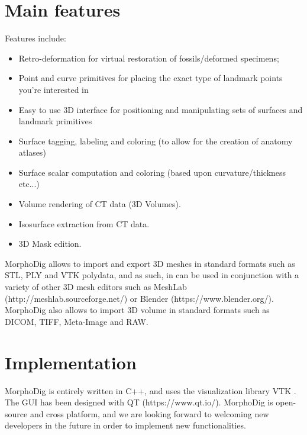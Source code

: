 \documentclass[12pt, a4paper]{book}
\begin{document}
\section*{Main features}
Features include:
\begin{itemize}
\item Retro-deformation for virtual restoration of fossils/deformed specimens;
\item Point and curve primitives for placing the exact type of landmark points you’re interested in
\item Easy to use 3D interface for positioning and manipulating sets of surfaces and landmark primitives
\item Surface tagging, labeling and coloring (to allow for the creation of anatomy atlases)
\item Surface scalar computation and coloring (based upon curvature/thickness etc...)
\item Volume rendering of CT data (3D Volumes).
\item Isosurface extraction from  CT data.
\item 3D Mask edition.
\end{itemize}

MorphoDig allows to import and export 3D meshes in standard formats such as STL, PLY and VTK polydata, and as such, in can be used in conjunction with a variety of other 3D mesh editors such  as MeshLab (http://meshlab.sourceforge.net/) or Blender (https://www.blender.org/). MorphoDig also allows to import 3D volume in standard formats such as DICOM, TIFF, Meta-Image and RAW.
\section*{Implementation}
MorphoDig is entirely written in C++, and uses the visualization library VTK \citep{Avila2001}. The GUI has been designed with QT (https://www.qt.io/). MorphoDig is open-source and cross platform, and we are looking forward to welcoming new developers in the future in order to implement new functionalities. 


		 
		 		 
     
		 
	   
		 
		 
		 
		 
		 
		 
		 
		
		
		 
		 
		 

\cleardoublepage
{}

  		
\end{document}
